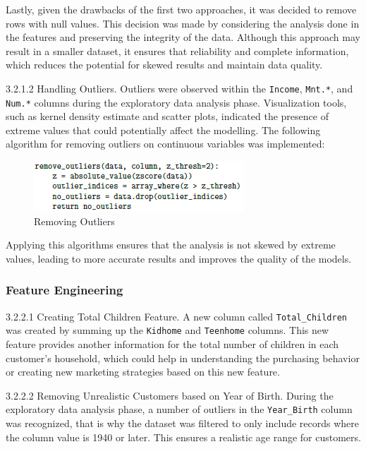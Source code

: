     Lastly, given the drawbacks of the first two approaches, it was decided to remove rows with null values. This decision was made by considering the analysis done in the features and preserving the integrity of the data. Although this approach may result in a smaller dataset, it ensures that reliability and complete information, which reduces the potential for skewed results and maintain data quality.

    3.2.1.2 Handling Outliers. Outliers were observed within the \texttt{Income}, \texttt{Mnt.*}, and \texttt{Num.*} columns during the exploratory data analysis phase. Visualization tools, such as kernel density estimate and scatter plots, indicated the presence of extreme values that could potentially affect the modelling. The following algorithm for removing outliers on continuous variables was implemented:

\begin{figure}[H]
    \centering
    \includegraphics[width=\linewidth]{figures/removing_outliers.png}
    \caption{Removing Outliers}
\end{figure}

    Applying this algorithms ensures that the analysis is not skewed by extreme values, leading to more accurate results and improves the quality of the models.

\subsubsection{Feature Engineering}

    3.2.2.1 Creating Total Children Feature. A new column called \texttt{Total\_Children} was created by summing up the \texttt{Kidhome} and \texttt{Teenhome} columns. This new feature provides another information for the total number of children in each customer's household, which could help in understanding the purchasing behavior or creating new marketing strategies based on this new feature.

    3.2.2.2 Removing Unrealistic Customers based on Year of Birth. During the exploratory data analysis phase, a number of outliers in the \texttt{Year\_Birth} column was recognized, that is why the dataset was filtered to only include records where the column value is 1940 or later. This ensures a realistic age range for customers.

